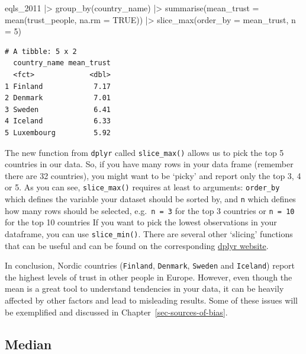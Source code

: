 \documentclass[
  letterpaper,
  DIV=11,
  numbers=noendperiod]{scrreprt}
\newenvironment{Shaded}{\begin{snugshade}}{\end{snugshade}}
\newcommand{\AttributeTok}[1]{\textcolor[rgb]{0.40,0.45,0.13}{#1}}
\newcommand{\ConstantTok}[1]{\textcolor[rgb]{0.56,0.35,0.01}{#1}}
\newcommand{\DecValTok}[1]{\textcolor[rgb]{0.68,0.00,0.00}{#1}}
\newcommand{\FunctionTok}[1]{\textcolor[rgb]{0.28,0.35,0.67}{#1}}
\newcommand{\NormalTok}[1]{\textcolor[rgb]{0.00,0.23,0.31}{#1}}
\newcommand{\SpecialCharTok}[1]{\textcolor[rgb]{0.37,0.37,0.37}{#1}}
\begin{document}
\begin{Shaded}
\begin{Highlighting}[]
\NormalTok{eqls\_2011 }\SpecialCharTok{|\textgreater{}}
  \FunctionTok{group\_by}\NormalTok{(country\_name) }\SpecialCharTok{|\textgreater{}}
  \FunctionTok{summarise}\NormalTok{(}\AttributeTok{mean\_trust =} \FunctionTok{mean}\NormalTok{(trust\_people, }\AttributeTok{na.rm =} \ConstantTok{TRUE}\NormalTok{)) }\SpecialCharTok{|\textgreater{}}
  \FunctionTok{slice\_max}\NormalTok{(}\AttributeTok{order\_by =}\NormalTok{ mean\_trust,}
            \AttributeTok{n =} \DecValTok{5}\NormalTok{)}
\end{Highlighting}
\end{Shaded}

\begin{verbatim}
# A tibble: 5 x 2
  country_name mean_trust
  <fct>             <dbl>
1 Finland            7.17
2 Denmark            7.01
3 Sweden             6.41
4 Iceland            6.33
5 Luxembourg         5.92
\end{verbatim}

The new function from \texttt{dplyr} called \texttt{slice\_max()} allows
us to pick the top 5 countries in our data. So, if you have many rows in
your data frame (remember there are 32 countries), you might want to be
`picky' and report only the top 3, 4 or 5. As you can see,
\texttt{slice\_max()} requires at least to arguments: \texttt{order\_by}
which defines the variable your dataset should be sorted by, and
\texttt{n} which defines how many rows should be selected,
e.g.~\texttt{n\ =\ 3} for the top 3 countries or \texttt{n\ =\ 10} for
the top 10 countries If you want to pick the lowest observations in your
dataframe, you can use \texttt{slice\_min()}. There are several other
`slicing' functions that can be useful and can be found on the
corresponding
\href{https://dplyr.tidyverse.org/reference/slice.html}{dplyr website}.

In conclusion, Nordic countries (\texttt{Finland}, \texttt{Denmark},
\texttt{Sweden} and \texttt{Iceland}) report the highest levels of trust
in other people in Europe. However, even though the mean is a great tool
to understand tendencies in your data, it can be heavily affected by
other factors and lead to misleading results. Some of these issues will
be exemplified and discussed in Chapter~\ref{sec-sources-of-bias}.

\subsection{Median}\label{sec-median}
\end{document}
